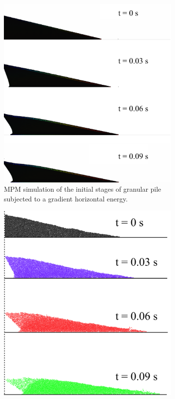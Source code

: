 \documentclass[3p,times,procedia,number]{elsarticle}
\begin{document}
\begin{figure}[tbph]
  \centering
  \begin{subfigure}[b]{0.47\textwidth}
    \centering
    \includegraphics[width=\textwidth]{figs/mpm_gradvelocity_200j}
    \caption{MPM simulation of the initial stages of granular pile subjected to a 
    gradient horizontal energy.}
    \label{fig:mpm_gradvelocity_200j}
  \end{subfigure}
  \begin{subfigure}[b]{0.47\textwidth}
    \centering
    \includegraphics[width=\textwidth]{figs/Gradient_Slope_CD_200J}

\end{subfigure}
\end{figure}
\end{document}
